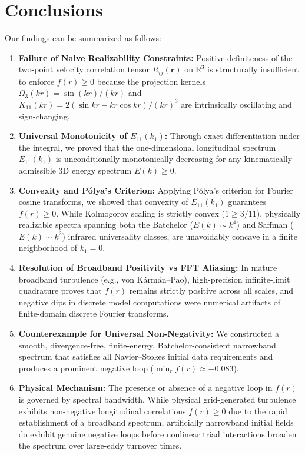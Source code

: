 \documentclass[lineno]{jfm}
\begin{document}
\section{Conclusions}
\label{sec:conclusions}
Our findings can be summarized as follows:
\begin{enumerate}
\item \textbf{Failure of Naive Realizability Constraints:} Positive-definiteness of the two-point velocity correlation tensor $R_{ij}(\mathbf{r})$ on $\mathbb{R}^3$ is structurally insufficient to enforce $f(r) \ge 0$ because the projection kernels $\Omega_3(kr) = \sin(kr)/(kr)$ and $K_{11}(kr) = 2(\sin kr - kr \cos kr)/(kr)^3$ are intrinsically oscillating and sign-changing.
\item \textbf{Universal Monotonicity of $E_{11}(k_1)$:} Through exact differentiation under the integral, we proved that the one-dimensional longitudinal spectrum $E_{11}(k_1)$ is unconditionally monotonically decreasing for any kinematically admissible 3D energy spectrum $E(k) \ge 0$.
\item \textbf{Convexity and P\'olya's Criterion:} Applying P\'olya's criterion for Fourier cosine transforms, we showed that convexity of $E_{11}(k_1)$ guarantees $f(r) \ge 0$. While Kolmogorov scaling is strictly convex ($1 \ge 3/11$), physically realizable spectra spanning both the Batchelor ($E(k) \sim k^4$) and Saffman ($E(k) \sim k^2$) infrared universality classes, are unavoidably concave in a finite neighborhood of $k_1 = 0$.
\item \textbf{Resolution of Broadband Positivity vs FFT Aliasing:} In mature broadband turbulence (e.g., von K\'arm\'an--Pao), high-precision infinite-limit quadrature proves that $f(r)$ remains strictly positive across all scales, and negative dips in discrete model computations were numerical artifacts of finite-domain discrete Fourier transforms.
\item \textbf{Counterexample for Universal Non-Negativity:} We constructed a smooth, divergence-free, finite-energy, Batchelor-consistent narrowband spectrum that satisfies all Navier--Stokes initial data requirements and produces a prominent negative loop ($\min_r f(r) \approx -0.083$).
\item \textbf{Physical Mechanism:} The presence or absence of a negative loop in $f(r)$ is governed by spectral bandwidth. While physical grid-generated turbulence exhibits non-negative longitudinal correlations $f(r) \ge 0$ due to the rapid establishment of a broadband spectrum, artificially narrowband initial fields do exhibit genuine negative loops before nonlinear triad interactions broaden the spectrum over large-eddy turnover times.
\end{enumerate}
\end{document}
